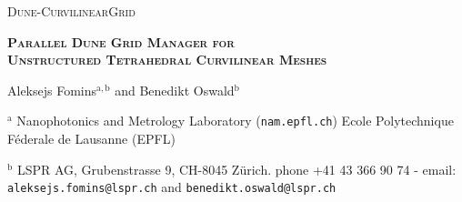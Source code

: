 \documentclass[a4paper,11pt]{book}
\begin{document}
\lstset{language=C++, breaklines=true}



\begin{titlepage}




\begin{center}
    
\noindent \textsc{{\Large Dune-CurvilinearGrid}}

\vspace{5mm}

\noindent \textbf{\textsc{{\Large Parallel Dune Grid Manager for\\Unstructured Tetrahedral Curvilinear Meshes}}}
  
\vspace{2mm}
    
{\large
    
\noindent Aleksejs Fomins$^{\mathrm{a,b}}$ and Benedikt Oswald$^{\mathrm{b}}$

  }

\vspace{1mm}

\noindent $^{\mathrm{a}}$ Nanophotonics and Metrology Laboratory (\texttt{nam.epfl.ch})
\noindent Ecole Polytechnique F\'ederale de Lausanne (EPFL)
  
\vspace{1mm}

\noindent $^{\mathrm{b}}$ LSPR AG, Grubenstrasse 9, CH-8045 Z\"urich.
\noindent phone +41 43 366 90 74 - email: \texttt{aleksejs.fomins@lspr.ch} and \texttt{benedikt.oswald@lspr.ch}

\vspace{2mm}


\end{center}











\pagebreak


\vfill


\end{titlepage}
\end{document}
